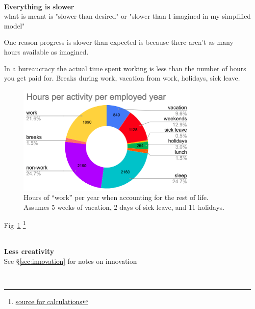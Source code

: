 \ \\

\textbf{Everything is slower}\\
what is meant is "slower than desired" or "slower than I imagined in my simplified model"

One reason progress is slower than expected is because there aren't as many hours available as imagined.



In a bureaucracy the actual time spent working is less than the number of hours you get paid for. Breaks during work, vacation from work, holidays, sick leave. 


\begin{figure}
    \centering
    \includegraphics[width=0.8\textwidth]{images/hours_per_activity_per_employed_year}
    \caption{Hours of ``work'' per year when accounting for the rest of life. Assumes 5 weeks of vacation, 2 days of sick leave, and 11 holidays.}
    \label{fig:hours_per_year}
\end{figure}

Fig~\ref{fig:hours_per_year}
\footnote{\href{https://docs.google.com/spreadsheets/d/1ZaOZZXWkEzX4fFltUdlR4A6ENrAXnkzTW4YrjA4tDO8/edit?usp=sharing}{source for calculations}}

\ \\

\textbf{Less creativity}\\
See \S\ref{sec:innovation} for notes on innovation

\ \\

